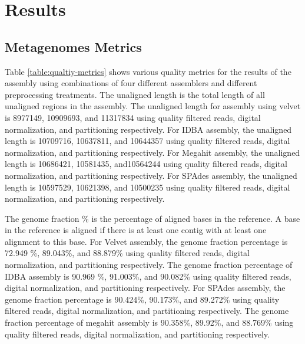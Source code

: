 \section*{Results}

\subsection*{Metagenomes Metrics}   
Table \ref {table:qualtiy-metrics} shows various quality metrics for the results of the assembly using combinations of four different assemblers and different preprocessing treatments.
The unaligned length is the total length of all unaligned regions in the assembly.  The unaligned length for assembly using velvet is 8977149, 10909693, and 11317834 using quality filtered reads, digital normalization, and partitioning respectively. For IDBA assembly, the unaligned length is 10709716, 10637811, and 10644357 using quality filtered reads, digital normalization, and partitioning respectively. For Megahit assembly, the unaligned length is 10686421, 10581435, and10564244 using quality filtered reads, digital normalization, and partitioning respectively.   For SPAdes assembly, the unaligned length is 10597529, 10621398, and 10500235 using quality filtered reads, digital normalization, and partitioning respectively. 

The genome fraction \% is the percentage of aligned bases in the reference. A base in the reference is aligned if there is at least one contig with at least one alignment to this base. For Velvet assembly,  the genome fraction percentage is 72.949 \%, 89.043\%, and 88.879\%  using quality filtered reads, digital normalization, and partitioning respectively. The genome fraction percentage of IDBA assembly is 90.969 \%, 91.003\%, and 90.082\% using quality filtered reads, digital normalization, and partitioning respectively.  For SPAdes assembly, the genome fraction percentage is 90.424\%, 90.173\%, and 89.272\% using quality filtered reads, digital normalization, and partitioning respectively. The genome fraction percentage of megahit assembly is 90.358\%, 89.92\%, and 88.769\% using quality filtered reads, digital normalization, and partitioning respectively. 
 
